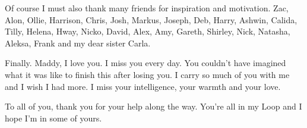 Of course I must also thank many friends for inspiration and motivation. Zac, Alon, Ollie, Harrison, Chris, Josh, Markus, Joseph, Deb, Harry, Ashwin, Calida, Tilly, Helena, Hway, Nicko, David, Alex, Amy, Gareth, Shirley, Nick, Natasha, Aleksa, Frank and my dear sister Carla.

Finally. Maddy, I love you. I miss you every day. You couldn't have imagined what it was like to finish this after losing you. I carry so much of you with me and I wish I had more. I miss your intelligence, your warmth and your love.

To all of you, thank you for your help along the way. You're all in my Loop \cite{hofstadter2007} and I hope I'm in some of yours.
